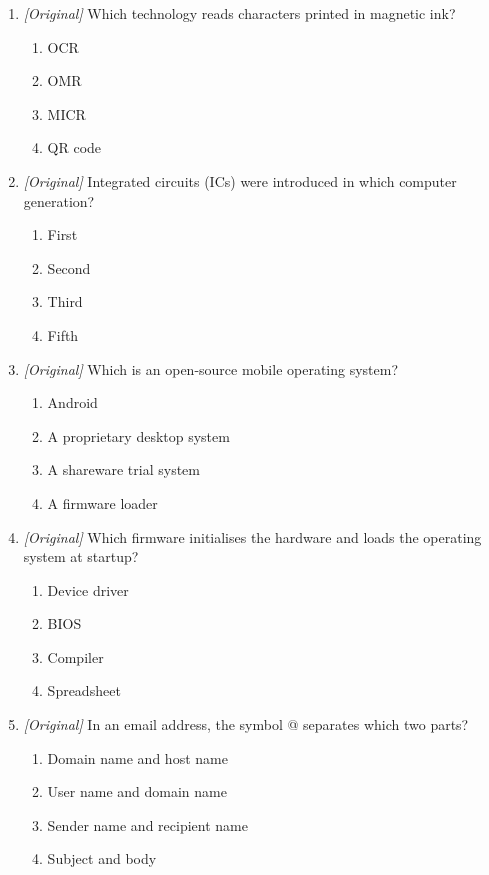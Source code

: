 \documentclass[11pt]{article}
\begin{document}
\begin{enumerate}[label=\textbf{Q\arabic*.}, leftmargin=*]
\begin{enumerate}[label=\Alph*.]
    \item \#
  \end{enumerate}
\item \textit{[Original]} Which technology reads characters printed in
  magnetic ink?
  \begin{enumerate}[label=\Alph*.]
    \item OCR
    \item OMR
    \item MICR
    \item QR code
  \end{enumerate}
\item \textit{[Original]} Integrated circuits (ICs) were introduced in which
  computer generation?
  \begin{enumerate}[label=\Alph*.]
    \item First
    \item Second
    \item Third
    \item Fifth
  \end{enumerate}
\item \textit{[Original]} Which is an open-source mobile operating system?
  \begin{enumerate}[label=\Alph*.]
    \item Android
    \item A proprietary desktop system
    \item A shareware trial system
    \item A firmware loader
  \end{enumerate}
\item \textit{[Original]} Which firmware initialises the hardware and loads
  the operating system at startup?
  \begin{enumerate}[label=\Alph*.]
    \item Device driver
    \item BIOS
    \item Compiler
    \item Spreadsheet
  \end{enumerate}
\item \textit{[Original]} In an email address, the symbol @ separates which
  two parts?
  \begin{enumerate}[label=\Alph*.]
    \item Domain name and host name
    \item User name and domain name
    \item Sender name and recipient name
    \item Subject and body

\end{enumerate}
\end{enumerate}
\end{document}
